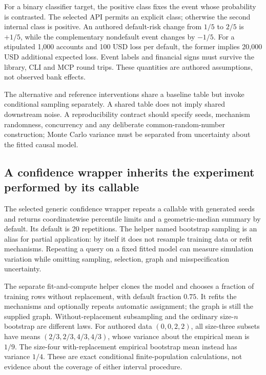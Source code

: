 For a binary classifier target, the positive class fixes the event whose
probability is contrasted. The selected API permits an explicit class;
otherwise the second internal class is positive. An authored default-risk
change from $1/5$ to $2/5$ is $+1/5$, while the complementary nondefault
event changes by $-1/5$. For a stipulated 1,000 accounts and 100 USD loss
per default, the former implies 20,000 USD additional expected loss.
Event labels and financial signs must survive the library, CLI and MCP
round trips. These quantities are authored assumptions, not observed
bank effects.~\citep{exec24_gcm_source,exec24_gcm_choice}

The alternative and reference interventions share a baseline table but
invoke conditional sampling separately. A shared table does not imply
shared downstream noise. A reproducibility contract should specify seeds,
mechanism randomness, concurrency and any deliberate common-random-number
construction; Monte Carlo variance must be separated from uncertainty
about the fitted causal model.~\citep{exec24_gcm_source,exec24_gcm_choice}

\subsection{A confidence wrapper inherits the experiment performed by its callable}
The selected generic confidence wrapper repeats a callable with generated
seeds and returns coordinatewise percentile limits and a geometric-median
summary by default. Its default is 20 repetitions. The helper named
bootstrap sampling is an alias for partial application: by itself it
does not resample training data or refit mechanisms. Repeating a query
on a fixed fitted model can measure simulation variation while omitting
sampling, selection, graph and misspecification uncertainty.
\citep{exec24_gcm_source}

The separate fit-and-compute helper clones the model and chooses a
fraction of training rows without replacement, with default fraction
$0.75$. It refits the mechanisms and optionally repeats automatic
assignment; the graph is still the supplied graph. Without-replacement
subsampling and the ordinary size-$n$ bootstrap are different laws.
For authored data $(0,0,2,2)$, all size-three subsets have means
$(2/3,2/3,4/3,4/3)$, whose variance about the empirical mean is $1/9$.
The size-four with-replacement empirical bootstrap mean instead has
variance $1/4$. These are exact conditional finite-population calculations,
not evidence about the coverage of either interval procedure.
\citep{exec24_gcm_source,exec24_gcm_choice}

